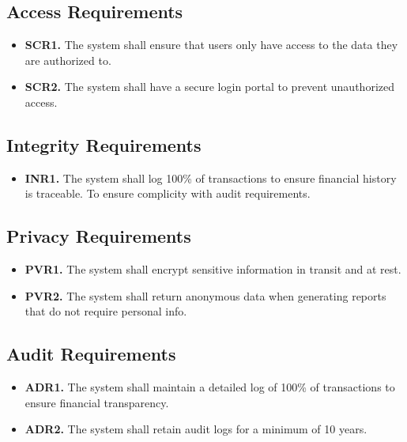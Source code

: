 \documentclass[12pt]{article}
\begin{document}
\subsection{Access Requirements}

\label{SCR}

\begin{itemize}
    \item \textbf{SCR1.} The system shall ensure that users only have access to the data they are authorized to.
    \item \textbf{SCR2.} The system shall have a secure login portal to prevent unauthorized access.
\end{itemize}

\subsection{Integrity Requirements}

\label{INR}

\begin{itemize}
    \item \textbf{INR1.} The system shall log 100\% of transactions to ensure financial history is traceable. To ensure complicity with audit requirements.
\end{itemize}
\subsection{Privacy Requirements}

\label{PVR}

\begin{itemize}
    \item \textbf{PVR1.} The system shall encrypt sensitive information in transit and at rest.
    \item \textbf{PVR2.} The system shall return anonymous data when generating reports that do not require personal info.
\end{itemize}
\subsection{Audit Requirements}

\label{ADR}

\begin{itemize}
    \item \textbf{ADR1.} The system shall maintain a detailed log of 100\% of transactions to ensure financial transparency.
    \item \textbf{ADR2.} The system shall retain audit logs for a minimum of 10 years.
\end{itemize}
\end{document}
